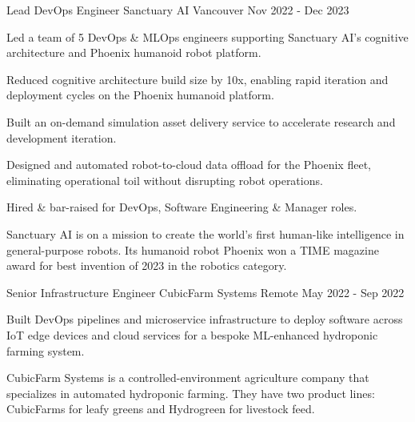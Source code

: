 \begin{cventries}
\cventrywithsummary
{Lead DevOps Engineer} %
{Sanctuary AI} %
{Vancouver} %
{Nov 2022 - Dec 2023} %
{
  \begin{cvitems} %
    \item {Led a team of 5 DevOps \& MLOps engineers supporting Sanctuary AI's cognitive architecture and Phoenix humanoid robot platform.}
    \item {Reduced cognitive architecture build size by 10x, enabling rapid iteration and deployment cycles on the Phoenix humanoid platform.}
    \item {Built an on-demand simulation asset delivery service to accelerate research and development iteration.}
    \item {Designed and automated robot-to-cloud data offload for the Phoenix fleet, eliminating operational toil without disrupting robot operations.}
    \item {Hired \& bar-raised for DevOps, Software Engineering \& Manager roles.}
  \end{cvitems}
}
{
  Sanctuary AI is on a mission to create the world's first human-like intelligence in general-purpose robots.
  Its humanoid robot Phoenix won a TIME magazine award for best invention of 2023 in the robotics category.
}

\cventrywithsummary
{Senior Infrastructure Engineer} %
{CubicFarm Systems} %
{Remote} %
{May 2022 - Sep 2022} %
{
  \begin{cvitems} %
    \item {Built DevOps pipelines and microservice infrastructure to deploy software across IoT edge devices and cloud services for a bespoke ML-enhanced hydroponic farming system.}
  \end{cvitems}
}
{
  CubicFarm Systems is a controlled-environment agriculture company that specializes in automated hydroponic farming.
  They have two product lines: CubicFarms for leafy greens and Hydrogreen for livestock feed.
}


\end{cventries}
